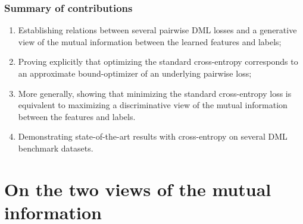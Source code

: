 \documentclass[runningheads]{llncs}
\begin{document}
\subsubsection{Summary of contributions}
\begin{enumerate}
    \item Establishing relations between several pairwise DML losses and a generative view of the mutual information between the learned features and labels;
    \item Proving explicitly that optimizing the standard cross-entropy corresponds to an approximate bound-optimizer of an underlying pairwise loss;
    \item More generally, showing that minimizing the standard cross-entropy loss is equivalent to maximizing a discriminative view of the mutual information between the features and labels. 
    \item Demonstrating state-of-the-art results with cross-entropy on several DML benchmark datasets.
\end{enumerate}

%
 \section{On the two views of the mutual information}\label{sec:two_views_on_mi}
\end{document}
